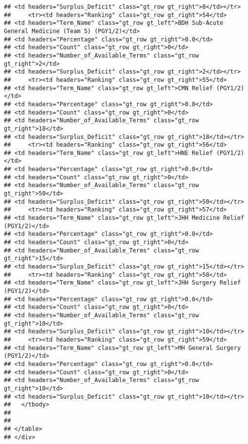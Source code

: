 \documentclass[
]{article}
\begin{document}
\begin{verbatim}
## <td headers="Surplus_Deficit" class="gt_row gt_right">8</td></tr>
##     <tr><td headers="Ranking" class="gt_row gt_right">54</td>
## <td headers="Term_Name" class="gt_row gt_left">BDH Sub-Acute General Medicine (Team 5) (PGY1/2)</td>
## <td headers="Percentage" class="gt_row gt_right">0.0</td>
## <td headers="Count" class="gt_row gt_right">0</td>
## <td headers="Number_of_Available_Terms" class="gt_row gt_right">2</td>
## <td headers="Surplus_Deficit" class="gt_row gt_right">2</td></tr>
##     <tr><td headers="Ranking" class="gt_row gt_right">55</td>
## <td headers="Term_Name" class="gt_row gt_left">CMN Relief (PGY1/2)</td>
## <td headers="Percentage" class="gt_row gt_right">0.0</td>
## <td headers="Count" class="gt_row gt_right">0</td>
## <td headers="Number_of_Available_Terms" class="gt_row gt_right">18</td>
## <td headers="Surplus_Deficit" class="gt_row gt_right">18</td></tr>
##     <tr><td headers="Ranking" class="gt_row gt_right">56</td>
## <td headers="Term_Name" class="gt_row gt_left">HNE Relief (PGY1/2)</td>
## <td headers="Percentage" class="gt_row gt_right">0.0</td>
## <td headers="Count" class="gt_row gt_right">0</td>
## <td headers="Number_of_Available_Terms" class="gt_row gt_right">50</td>
## <td headers="Surplus_Deficit" class="gt_row gt_right">50</td></tr>
##     <tr><td headers="Ranking" class="gt_row gt_right">57</td>
## <td headers="Term_Name" class="gt_row gt_left">JHH Medicine Relief (PGY1/2)</td>
## <td headers="Percentage" class="gt_row gt_right">0.0</td>
## <td headers="Count" class="gt_row gt_right">0</td>
## <td headers="Number_of_Available_Terms" class="gt_row gt_right">15</td>
## <td headers="Surplus_Deficit" class="gt_row gt_right">15</td></tr>
##     <tr><td headers="Ranking" class="gt_row gt_right">58</td>
## <td headers="Term_Name" class="gt_row gt_left">JHH Surgery Relief (PGY1/2)</td>
## <td headers="Percentage" class="gt_row gt_right">0.0</td>
## <td headers="Count" class="gt_row gt_right">0</td>
## <td headers="Number_of_Available_Terms" class="gt_row gt_right">10</td>
## <td headers="Surplus_Deficit" class="gt_row gt_right">10</td></tr>
##     <tr><td headers="Ranking" class="gt_row gt_right">59</td>
## <td headers="Term_Name" class="gt_row gt_left">MH General Surgery (PGY1/2)</td>
## <td headers="Percentage" class="gt_row gt_right">0.0</td>
## <td headers="Count" class="gt_row gt_right">0</td>
## <td headers="Number_of_Available_Terms" class="gt_row gt_right">10</td>
## <td headers="Surplus_Deficit" class="gt_row gt_right">10</td></tr>
##   </tbody>
##   
##   
## </table>
## </div>
\end{verbatim}
\end{document}
